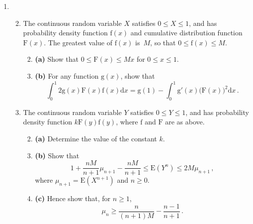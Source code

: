 \documentclass[a4, 11pt]{report}
\newlength{\qspace}
\newcounter{qnumber}
\newenvironment{question}%
 {\vspace{\qspace}
  \begin{enumerate}[\bfseries 1\quad][10]%
    \setcounter{enumi}{\value{qnumber}}%
    \item%
 }
{
  \end{enumerate}
  \filbreak
  \stepcounter{qnumber}
 }
\newenvironment{questionparts}[1][1]%
 {
  \begin{enumerate}[\bfseries (i)]%
    \setcounter{enumii}{#1}
    \addtocounter{enumii}{-1}
    \setlength{\itemsep}{5mm}
    \setlength{\parskip}{8pt}
 }
 {
  \end{enumerate}
 }
\def\d{{\mathrm d}}
\def\g{{\mathrm g}}
\def\f{{\mathrm f}}
\def\E{{\mathrm E}}
\def\F{{\mathrm F}}
\def\le{\leqslant}
\def\ge{\geqslant}
\begin{document}
\begin{question}
\begin{questionparts}
\item
The continuous random variable $X$ satisfies
$0\le X\le 1$, and has probability density function
$\f(x)$ and cumulative distribution
function $\F(x)$. The 
greatest value of $\f(x)$ is~$M$, so that $0\le \f(x) \le M$. 

\begin{questionparts}
\item[\bf (a)]
Show that $0\le \F(x) \le Mx$ for $0\le x\le1$.

\item[\bf (b)]
For any function $\g(x)$, show that
\[
\int_0^1 2 \g(x) \F(x) \f(x) \d x =  \g(1) - 
 \int_0^1 \g'(x) \big( \F(x)\big)^2 \d x
\,.
\]
\end{questionparts}
\item
The 
continuous random variable $Y$ 
satisfies
$0\le Y\le 1$, and has probability density function
$k \F(y) \f(y)$, where $\f$ and $\F$ are as above. 

\begin{questionparts}
\item[\bf (a)]
Determine the
value of the constant $k$.
\item[\bf (b)]
Show that
\[
1+ \frac{nM}{n+1}\mu_{n+1} - \frac{nM}{n+1}
\le \E(Y^n) \le 2M\mu_{n+1}\,,
\]
where $\mu_{n+1} = \E(X^{n+1})$ and $n\ge0$.
\item[\bf (c)]
Hence  show that, for $n\ge 1$,
\[
\mu _n \ge \frac{n}{(n+1)M} -\frac{n-1}{n+1}
\,.\]

\end{questionparts}
\end{questionparts}
\end{question}
\end{document}

